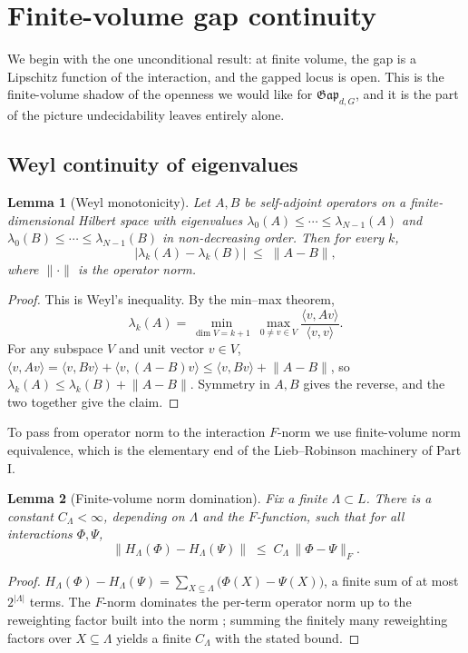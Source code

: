 \documentclass[12pt]{article}
\newcommand{\Ffun}{F}                          %
\newcommand{\Gap}{\mathfrak{Gap}}              %
\newcommand{\norm}[1]{\lVert #1 \rVert}
\newcommand{\abs}[1]{\lvert #1 \rvert}
\newcommand{\ip}[1]{\langle #1 \rangle}
\theoremstyle{plain}
\newtheorem{lemma}[lemma]{Lemma}
\theoremstyle{definition}
\theoremstyle{remark}
\begin{document}
\section{Finite-volume gap continuity}
\label{sec:finite}

We begin with the one unconditional result: at finite volume, the gap is a Lipschitz
function of the interaction, and the gapped locus is open. This is the finite-volume
shadow of the openness we would like for $\Gap_{d,G}$, and it is the part of the
picture undecidability leaves entirely alone.

\subsection{Weyl continuity of eigenvalues}
\label{sec:finite-weyl}

\begin{lemma}[Weyl monotonicity]
\label{lem:weyl}
Let $A,B$ be self-adjoint operators on a finite-dimensional Hilbert space with
eigenvalues $\lambda_0(A)\le\cdots\le\lambda_{N-1}(A)$ and
$\lambda_0(B)\le\cdots\le\lambda_{N-1}(B)$ in non-decreasing order. Then for every
$k$,
\[
\abs{\lambda_k(A)-\lambda_k(B)}\;\le\;\norm{A-B},
\]
where $\norm{\cdot}$ is the operator norm.
\end{lemma}

\begin{proof}
This is Weyl's inequality. By the min--max theorem,
\[
\lambda_k(A)=\min_{\dim V=k+1}\ \max_{0\ne v\in V}\frac{\ip{v,Av}}{\ip{v,v}}.
\]
For any subspace $V$ and unit vector $v\in V$,
$\ip{v,Av}=\ip{v,Bv}+\ip{v,(A-B)v}\le\ip{v,Bv}+\norm{A-B}$, so
$\lambda_k(A)\le\lambda_k(B)+\norm{A-B}$. Symmetry in $A,B$ gives the reverse, and the
two together give the claim.
\end{proof}

To pass from operator norm to the interaction $\Ffun$-norm we use finite-volume norm
equivalence, which is the elementary end of the Lieb--Robinson machinery of Part I\@.

\begin{lemma}[Finite-volume norm domination]
\label{lem:normdom}
Fix a finite $\Lambda\subset L$. There is a constant $C_\Lambda<\infty$, depending on
$\Lambda$ and the $\Ffun$-function, such that for all interactions $\Phi,\Psi$,
\[
\norm{H_\Lambda(\Phi)-H_\Lambda(\Psi)}\;\le\;C_\Lambda\,\norm{\Phi-\Psi}_{\Ffun}.
\]
\end{lemma}

\begin{proof}
$H_\Lambda(\Phi)-H_\Lambda(\Psi)=\sum_{X\subseteq\Lambda}\big(\Phi(X)-\Psi(X)\big)$,
a finite sum of at most $2^{\abs{\Lambda}}$ terms. The $\Ffun$-norm dominates the
per-term operator norm up to the reweighting factor built into the norm
\cite{nsy-quasilocality-1}; summing the finitely many reweighting factors over
$X\subseteq\Lambda$ yields a finite $C_\Lambda$ with the stated bound.
\end{proof}
\end{document}
